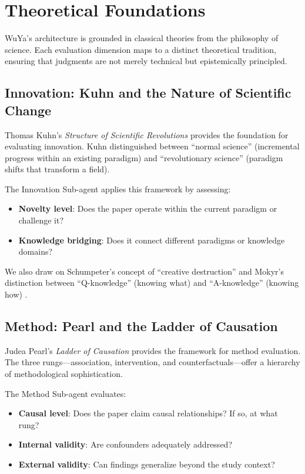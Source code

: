 \documentclass[11pt,a4paper]{article}
\begin{document}
\section{Theoretical Foundations}
\label{sec:theory}

WuYa's architecture is grounded in classical theories from the philosophy of science. Each evaluation dimension maps to a distinct theoretical tradition, ensuring that judgments are not merely technical but epistemically principled.

\subsection{Innovation: Kuhn and the Nature of Scientific Change}

Thomas Kuhn's \textit{Structure of Scientific Revolutions} \citep{kuhn1962structure} provides the foundation for evaluating innovation. Kuhn distinguished between ``normal science'' (incremental progress within an existing paradigm) and ``revolutionary science'' (paradigm shifts that transform a field).

The Innovation Sub-agent applies this framework by assessing:
\begin{itemize}
    \item \textbf{Novelty level}: Does the paper operate within the current paradigm or challenge it?
    \item \textbf{Knowledge bridging}: Does it connect different paradigms or knowledge domains?
\end{itemize}

We also draw on Schumpeter's concept of ``creative destruction'' \citep{schumpeter1942capitalism} and Mokyr's distinction between ``Q-knowledge'' (knowing what) and ``A-knowledge'' (knowing how) \citep{mokyr2002gifts}.

\subsection{Method: Pearl and the Ladder of Causation}

Judea Pearl's \textit{Ladder of Causation} \citep{pearl2018book} provides the framework for method evaluation. The three rungs---association, intervention, and counterfactuals---offer a hierarchy of methodological sophistication.

The Method Sub-agent evaluates:
\begin{itemize}
    \item \textbf{Causal level}: Does the paper claim causal relationships? If so, at what rung?
    \item \textbf{Internal validity}: Are confounders adequately addressed?
    \item \textbf{External validity}: Can findings generalize beyond the study context?
\end{itemize}
\end{document}
